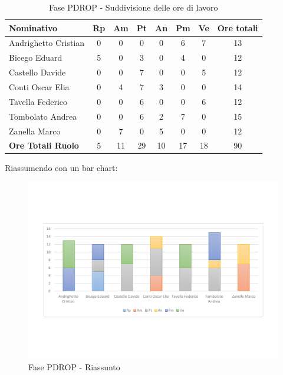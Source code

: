 \documentclass[../PianoProgetto.tex]{subfiles}
\begin{document}
	\begin{table}[h]
		\begin{tabularx}{\textwidth}{l  * {6}{C}  c}
			\toprule
			\textbf{Nominativo} & \textbf{Rp} & \textbf{Am} & \textbf{Pt} 
						& \textbf{An} & \textbf{Pm} & \textbf{Ve} & \textbf{Ore totali} \\
			\midrule
			Andrighetto Cristian & 0 & 0 & 0 & 0 & 6 & 7 & 13 \\
			Bicego Eduard & 5 & 0 &	3 &	0 &	4 &	0 &	12 \\
			Castello Davide & 0 & 0 & 7 & 0 & 0 & 5 & 12 \\
			Conti Oscar Elia &0 & 4 & 7 & 3 & 0 & 0 & 14 \\
			Tavella Federico &	0 & 0 & 6 & 0 & 0 & 6 & 12 \\
			Tombolato Andrea & 0 & 0 & 6 & 2 & 7 & 0 & 15 \\
			Zanella Marco & 0 & 7 & 0 & 5 & 0 & 0 & 12 \\
			\midrule			
			\textbf{Ore Totali Ruolo} & 5 & 11 & 29 & 10 & 17 & 18 & 90 \\
			\bottomrule
		\end{tabularx}
		\caption{Fase PDROP - Suddivisione delle ore di lavoro}
		\label{tab:fasePDROP_ore}
	\end{table}
	
\newpage
\vfill	
	Riassumendo con un bar chart:
	
	\begin{figure}[!h]
		\centering
		\includegraphics[width=\textwidth , trim=2cm 5cm 2cm 5cm]{grafici/PDROP/PDROP-ore-persona}
			\caption{Fase PDROP - Riassunto}
		\label{fig:BarChart-fasePDROP_ore}
	\end{figure}
\vfill	
	
\end{document}
